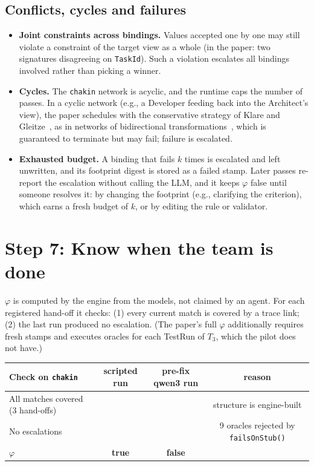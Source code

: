 \documentclass[10pt,a4paper]{article}
\newcommand{\cmark}{\ding{51}}
\newcommand{\xmark}{\ding{55}}
\newcommand{\cls}[1]{\textsf{#1}}
\newcommand{\code}[1]{\texttt{#1}}
\theoremstyle{definition}
\begin{document}
\subsection{Conflicts, cycles and failures}

\begin{itemize}[nosep]
\item \textbf{Joint constraints across bindings.} Values accepted one by one
may still violate a constraint of the target view as a whole (in the paper:
two signatures disagreeing on \code{TaskId}). Such a violation escalates all
bindings involved rather than picking a winner.
\item \textbf{Cycles.} The \texttt{chakin} network is acyclic, and the
runtime caps the number of passes. In a cyclic network (e.g., a Developer
feeding back into the Architect's view), the paper schedules with the
conservative strategy of Klare and Gleitze~\cite{klare2023termination}, as in
networks of bidirectional transformations~\cite{stevens2020networks}, which is guaranteed to terminate
but may fail; failure is escalated.
\item \textbf{Exhausted budget.} A binding that fails $k$ times is
escalated and left unwritten, and its footprint digest is stored as a failed
stamp. Later passes re-report the escalation without calling the LLM, and it
keeps $\varphi$ false until someone resolves it: by changing the footprint
(e.g., clarifying the criterion), which earns a fresh budget of $k$, or by
editing the rule or validator.
\end{itemize}

\section{Step 7: Know when the team is done}\label{sec:step7}

$\varphi$ is computed by the engine from the models, not claimed by an agent.
For each registered hand-off it checks: (1) every current match is covered by
a trace link; (2) the last run produced no escalation. (The paper's full
$\varphi$ additionally requires fresh stamps and executes oracles for each
\cls{TestRun} of $T_3$, which the pilot does not have.)

\begin{center}\small
\begin{tabular}{@{}l c c c@{}}
\toprule
Check on \texttt{chakin} & scripted run & pre-fix qwen3 run & reason \\
\midrule
All matches covered (3 hand-offs) & \cmark & \cmark & structure is engine-built \\
No escalations & \cmark & \xmark & 9 oracles rejected by \code{failsOnStub()} \\
\midrule
$\varphi$ & \textbf{true} & \textbf{false} & \\
\bottomrule
\end{tabular}
\end{center}
\end{document}
